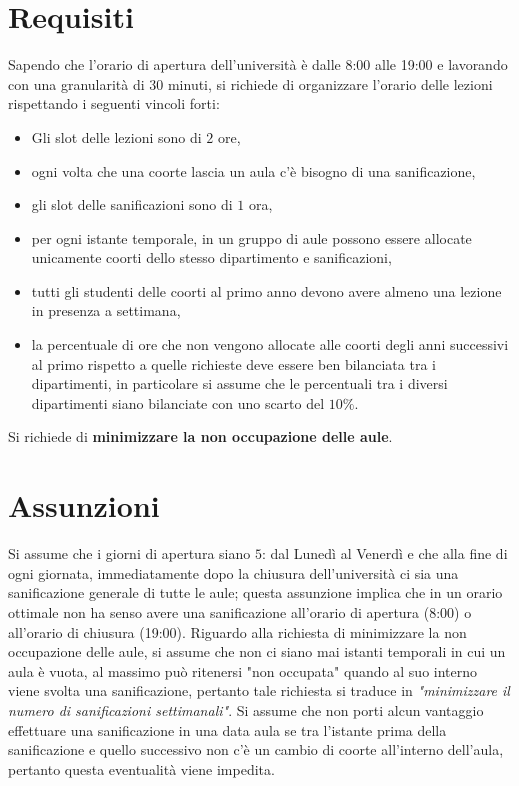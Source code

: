 \documentclass[12pt,english, openany]{book}
\begin{document}
\section{Requisiti}
Sapendo che l'orario di apertura dell'università è dalle 8:00 alle 19:00 e lavorando con una granularità di 30 minuti, si richiede di organizzare l'orario delle lezioni rispettando i seguenti vincoli forti:
\begin{itemize}
\item Gli slot delle lezioni sono di $2$ ore,
\item ogni volta che una coorte lascia un aula c'è bisogno di una sanificazione,
\item gli slot delle sanificazioni sono di $1$ ora,
\item per ogni istante temporale, in un gruppo di aule possono essere allocate unicamente coorti dello stesso dipartimento e sanificazioni,
\item tutti gli studenti delle coorti al primo anno devono avere almeno una lezione in presenza a settimana,
\item la percentuale di ore che non vengono allocate alle coorti degli anni successivi al primo rispetto a quelle richieste deve essere ben bilanciata tra i dipartimenti, in particolare si assume che le percentuali tra i diversi dipartimenti siano bilanciate con uno scarto del $10 \% $.
\end{itemize}
Si richiede di \textbf{minimizzare la non occupazione delle aule}.

\section{Assunzioni}
Si assume che i giorni di apertura siano $5$: dal Lunedì al Venerdì e che alla fine di ogni giornata, immediatamente dopo la chiusura dell'università ci sia una sanificazione generale di tutte le aule; questa assunzione implica che in un orario ottimale non ha senso avere una sanificazione all'orario di apertura (8:00) o all'orario di chiusura (19:00).
Riguardo alla richiesta di minimizzare la non occupazione delle aule, si assume che non ci siano mai istanti temporali in cui un aula è vuota, al massimo può ritenersi "non occupata" quando al suo interno viene svolta una sanificazione, pertanto tale richiesta si traduce in \textit{"minimizzare il numero di sanificazioni settimanali"}.
Si assume che non porti alcun vantaggio effettuare una sanificazione in una data aula se tra l'istante prima della sanificazione e quello successivo non c'è un cambio di coorte all'interno dell'aula, pertanto questa eventualità viene impedita.
\end{document}
